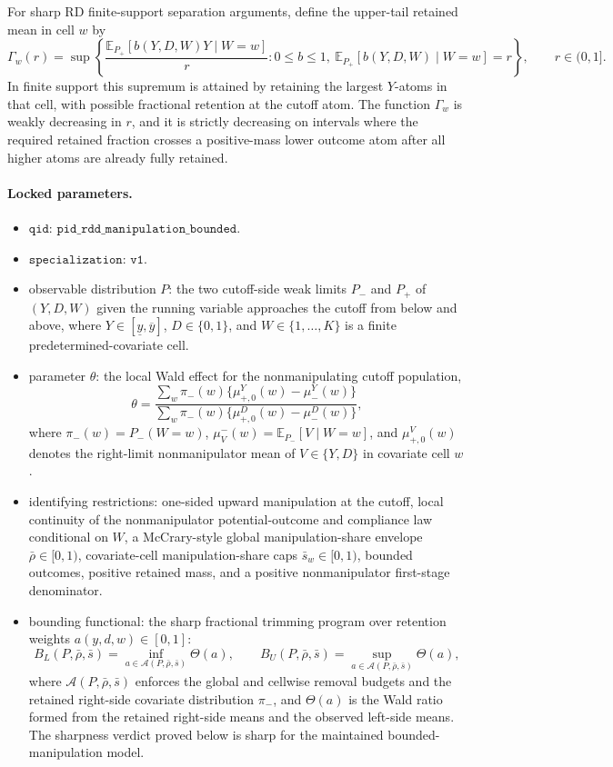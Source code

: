 \documentclass[11pt]{article}
\newcommand{\E}{\mathbb{E}}
\theoremstyle{definition}
\theoremstyle{plain}
\theoremstyle{remark}
\begin{document}
For sharp RD finite-support separation arguments, define the upper-tail retained mean in
cell \(w\) by
\[
  \Gamma_w(r)
  =
  \sup\left\{
    \frac{\E_{P_+}[b(Y,D,W)Y\mid W=w]}{r}:
    0\le b\le1,\ \E_{P_+}[b(Y,D,W)\mid W=w]=r
  \right\},
  \qquad r\in(0,1].
\]
In finite support this supremum is attained by retaining the largest \(Y\)-atoms in that
cell, with possible fractional retention at the cutoff atom.  The function
\(\Gamma_w\) is weakly decreasing in \(r\), and it is strictly decreasing on intervals
where the required retained fraction crosses a positive-mass lower outcome atom after all
higher atoms are already fully retained.

\paragraph{Locked parameters.}
\begin{itemize}
  \item \(\texttt{qid}\): \(\texttt{pid\_rdd\_manipulation\_bounded}\).
  \item \(\texttt{specialization}\): \(\texttt{v1}\).
  \item observable distribution \(P\): the two cutoff-side weak limits \(P_-\) and \(P_+\) of
  \((Y,D,W)\) given the running variable approaches the cutoff from below and above, where
  \(Y\in[\underline y,\overline y]\), \(D\in\{0,1\}\), and
  \(W\in\{1,\ldots,K\}\) is a finite predetermined-covariate cell.
  \item parameter \(\theta\): the local Wald effect for the nonmanipulating cutoff population,
  \[
    \theta =
    \frac{\sum_w \pi_-(w)\{\mu^Y_{+,0}(w)-\mu^Y_-(w)\}}
         {\sum_w \pi_-(w)\{\mu^D_{+,0}(w)-\mu^D_-(w)\}},
  \]
  where \(\pi_-(w)=P_-(W=w)\), \(\mu^-_V(w)=\E_{P_-}[V\mid W=w]\), and
  \(\mu^V_{+,0}(w)\) denotes the right-limit nonmanipulator mean of \(V\in\{Y,D\}\)
  in covariate cell \(w\).
  \item identifying restrictions: one-sided upward manipulation at the cutoff, local continuity
  of the nonmanipulator potential-outcome and compliance law conditional on \(W\), a
  McCrary-style global manipulation-share envelope \(\bar\rho\in[0,1)\),
  covariate-cell manipulation-share caps \(\bar s_w\in[0,1)\), bounded outcomes,
  positive retained mass, and a positive nonmanipulator first-stage denominator.
  \item bounding functional: the sharp fractional trimming program over retention weights
  \(a(y,d,w)\in[0,1]\):
  \[
    B_L(P,\bar\rho,\bar s)=\inf_{a\in\mathcal A(P,\bar\rho,\bar s)} \Theta(a),
    \qquad
    B_U(P,\bar\rho,\bar s)=\sup_{a\in\mathcal A(P,\bar\rho,\bar s)} \Theta(a),
  \]
  where \(\mathcal A(P,\bar\rho,\bar s)\) enforces the global and cellwise removal
  budgets and the retained right-side covariate distribution \(\pi_-\), and
  \(\Theta(a)\) is the Wald ratio formed from the retained right-side means and the
  observed left-side means.  The sharpness verdict proved below is sharp for the
  maintained bounded-manipulation model.
\end{itemize}
\end{document}
